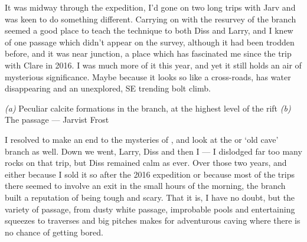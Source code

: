 	It was midway through the expedition, I'd gone on two long trips with Jarv and was keen to do something different. Carrying on with the resurvey of the  branch seemed a good place to teach the technique to both Diss and Larry, and I knew of one passage which didn't appear on the survey, although it had been trodden before, and it was near  junction, a place which has fascinated me since the trip with Clare in 2016. I was much more of it this year, and yet it still holds an air of mysterious significance. Maybe because it looks so like a cross-roads, has water disappearing and an unexplored, SE trending bolt climb. 
	

	\begin{pagefigure}
	\checkoddpage \ifoddpage \forcerectofloat \else \forceversofloat \fi
	\centering
	\begin{subfigure}[t]{0.7031\textwidth}
		\centering
		 \caption{}\label{formations povezava}
	\end{subfigure}
  	 \hfill
   	 \begin{subfigure}[t]{0.2869\textwidth}
        		\centering
        		\caption{} \label{povezava passage}
        \end{subfigure}
	\caption{
	 	  \textit{(a)} Peculiar calcite formations in the \protect{} branch, at the highest level of the rift
   		 \textit{(b)} The \protect{} passage --- Jarvist Frost}
\end{pagefigure}

	I resolved to make an end to the mysteries of , and look at the  or `old cave' branch as well. Down we went, Larry, Diss and then I --- I dislodged far too many rocks on that trip, but Diss remained calm as ever. Over those two years, and either because I sold it so after the 2016 expedition or because most of the trips there seemed to involve an  exit in the small hours of the morning, the  branch built a reputation of being tough and scary.  That it is, I have no doubt, but the variety of passage, from dusty white  passage, improbable pools and entertaining squeezes to traverses and big pitches makes for adventurous caving where there is no chance of getting bored. 
    	
